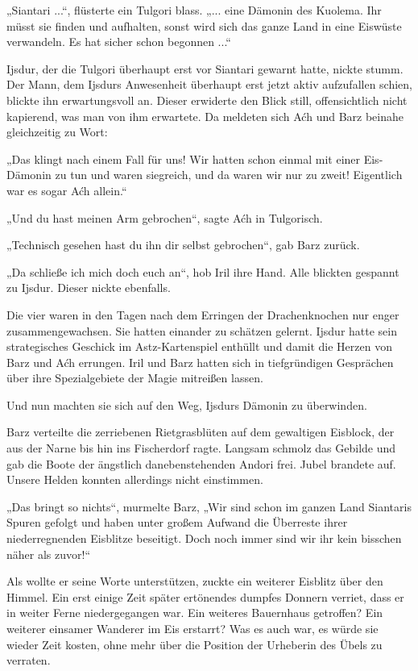 „Siantari ...“, flüsterte ein Tulgori blass. „... eine Dämonin des Kuolema. Ihr müsst sie finden und aufhalten, sonst wird sich das ganze Land in eine Eiswüste verwandeln. Es hat sicher schon begonnen ...“

Ijsdur, der die Tulgori überhaupt erst vor Siantari gewarnt hatte, nickte stumm. Der Mann, dem Ijsdurs Anwesenheit überhaupt erst jetzt aktiv aufzufallen schien, blickte ihn erwartungsvoll an. Dieser erwiderte den Blick still, offensichtlich nicht kapierend, was man von ihm erwartete. Da meldeten sich Aćh und Barz beinahe gleichzeitig zu Wort:

„Das klingt nach einem Fall für uns! Wir hatten schon einmal mit einer Eis-Dämonin zu tun und waren siegreich, und da waren wir nur zu zweit! Eigentlich war es sogar Aćh allein.“

„Und du hast meinen Arm gebrochen“, sagte Aćh in Tulgorisch.

„Technisch gesehen hast du ihn dir selbst gebrochen“, gab Barz zurück.

„Da schließe ich mich doch euch an“, hob Iril ihre Hand. Alle blickten gespannt zu Ijsdur. Dieser nickte ebenfalls.

Die vier waren in den Tagen nach dem Erringen der Drachenknochen nur enger zusammengewachsen. Sie hatten einander zu schätzen gelernt. Ijsdur hatte sein strategisches Geschick im Astz-Kartenspiel enthüllt und damit die Herzen von Barz und Aćh errungen. Iril und Barz hatten sich in tiefgründigen Gesprächen über ihre Spezialgebiete der Magie mitreißen lassen.

Und nun machten sie sich auf den Weg, Ijsdurs Dämonin zu überwinden.



\trennzeichen



Barz verteilte die zerriebenen Rietgrasblüten auf dem gewaltigen Eisblock, der aus der Narne bis hin ins Fischerdorf ragte. Langsam schmolz das Gebilde und gab die Boote der ängstlich danebenstehenden Andori frei. Jubel brandete auf. Unsere Helden konnten allerdings nicht einstimmen.

„Das bringt so nichts“, murmelte Barz, „Wir sind schon im ganzen Land Siantaris Spuren gefolgt und haben unter großem Aufwand die Überreste ihrer niederregnenden Eisblitze beseitigt. Doch noch immer sind wir ihr kein bisschen näher als zuvor!“

Als wollte er seine Worte unterstützen, zuckte ein weiterer Eisblitz über den Himmel. Ein erst einige Zeit später ertönendes dumpfes Donnern verriet, dass er in weiter Ferne niedergegangen war. Ein weiteres Bauernhaus getroffen? Ein weiterer einsamer Wanderer im Eis erstarrt? Was es auch war, es würde sie wieder Zeit kosten, ohne mehr über die Position der Urheberin des Übels zu verraten.

